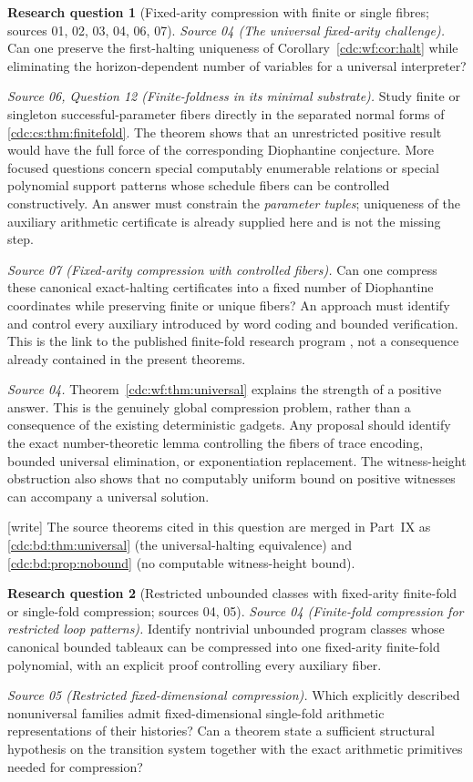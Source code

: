 \documentclass[11pt,a4paper]{article}
\theoremstyle{definition}
\newtheorem{question}[question]{Research question}
\theoremstyle{remark}
\newcommand{\wtag}{\textup{[write]}}%
\begin{document}
\begin{question}[Fixed-arity compression with finite or single fibres; sources 01, 02, 03, 04, 06, 07]
\emph{Source 04 (The universal fixed-arity challenge).}
Can one preserve the first-halting uniqueness of Corollary~\ref{cdc:wf:cor:halt} while eliminating the horizon-dependent number of variables for a universal interpreter?

\emph{Source 06, Question 12 (Finite-foldness in its minimal substrate).}
Study finite or singleton successful-parameter fibers
directly in the separated normal forms of \cref{cdc:cs:thm:finitefold}. The theorem
shows that an unrestricted positive result would have the full force of the
corresponding Diophantine conjecture. More focused questions concern special
computably enumerable relations or special polynomial support patterns whose
schedule fibers can be controlled constructively. An answer must constrain
the \emph{parameter tuples}; uniqueness of the auxiliary arithmetic
certificate is already supplied here and is not the missing step.

\emph{Source 07 (Fixed-arity compression with controlled fibers).}
Can one compress these canonical exact-halting certificates into a fixed number of Diophantine coordinates while preserving finite or unique fibers? An approach must identify and control every auxiliary introduced by word coding and bounded verification. This is the link to the published finite-fold research program \cite{cco-six}, not a consequence already contained in the present theorems.
\end{question}

\emph{Source 04.} Theorem~\ref{cdc:wf:thm:universal} explains the strength of a positive answer. This is the genuinely global compression problem, rather than a consequence of the existing deterministic gadgets. Any proposal should identify the exact number-theoretic lemma controlling the fibers of trace encoding, bounded universal elimination, or exponentiation replacement. The witness-height obstruction also shows that no computably uniform bound on positive witnesses can accompany a universal solution.

\wtag{} The source theorems cited in this question are merged in Part~IX
as \cref{cdc:bd:thm:universal} (the universal-halting equivalence) and
\cref{cdc:bd:prop:nobound} (no computable witness-height bound).

\begin{question}[Restricted unbounded classes with fixed-arity finite-fold or single-fold compression; sources 04, 05]\label{cdc:q:restricted}
\emph{Source 04 (Finite-fold compression for restricted loop patterns).}
Identify nontrivial unbounded program classes whose canonical bounded tableaux can be compressed into one fixed-arity finite-fold polynomial, with an explicit proof controlling every auxiliary fiber.

\emph{Source 05 (Restricted fixed-dimensional compression).}
Which explicitly described nonuniversal families admit fixed-dimensional single-fold arithmetic representations of their histories? Can a theorem state a sufficient structural hypothesis on the transition system together with the exact arithmetic primitives needed for compression?
\end{question}
\end{document}
